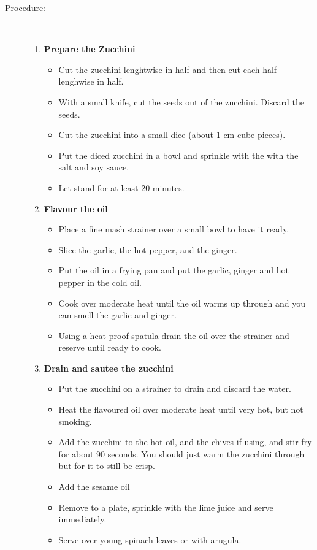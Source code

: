 \documentclass[11pt,letterpaper]{article}
\newcommand \fileName {AsianZucchini}
\begin{document}
\begin{description}
\item[Procedure:]\ \\
	\begin{enumerate}
	\item {\bf Prepare the Zucchini}
	\begin{itemize}
	\item Cut the zucchini lenghtwise in half and then cut each half lenghwise in half.
	\item With a small knife, cut the seeds out of the zucchini. Discard the seeds.
	\item Cut the zucchini into a small dice (about 1 cm cube pieces).
	\item  Put the diced zucchini in a bowl and sprinkle with the with the salt and soy sauce.
	\item Let stand for at least 20 minutes.
	\end{itemize}
	\item {\bf Flavour the oil}
	\begin{itemize}
        \item Place a fine mash strainer over a small bowl to have it ready.
	\item Slice the garlic, the hot pepper, and the ginger.
	\item Put the oil in a frying pan and put the garlic, ginger and hot pepper in the cold oil.
	\item Cook over moderate heat until the oil warms up through and you can smell the garlic and ginger.
	\item Using a heat-proof spatula drain the oil over the strainer and reserve until ready to cook.
	\end{itemize}
	\item{\bf Drain and sautee the zucchini}
	\begin{itemize}
	\item Put the zucchini on a strainer to drain and discard the water.
	\item Heat the flavoured oil over moderate heat until very hot, but not smoking.
	\item Add the zucchini to the hot oil, and the chives if using, and stir fry for about 90 seconds. You should just warm the zucchini through but for it to still be crisp.
        \item Add the sesame oil
	\item Remove to a plate, sprinkle with the lime juice and serve immediately.	
        \item Serve over young spinach leaves or with arugula.
	\end{itemize}
	\end{enumerate}
\end{description}

\end{document}
